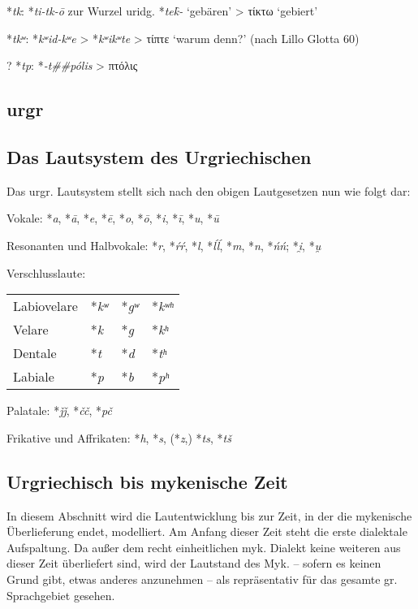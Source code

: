 \documentclass[12pt,a4paper,normalheadings]{scrartcl}
\def\rek#1{*\textit{#1}}
\begin{document}
\rek{tk}: \rek{ti-tk-ō} zur Wurzel uridg. \rek{tek̑-} `gebären' > τίκτω `gebiert'

\rek{tkʷ}: \rek{kʷid-kʷe} > \rek{kʷikʷte} > τίπτε `warum denn?' (nach Lillo Glotta 60)

? \rek{tp}: \rek{-t\#\#pólis} > πτόλις

\subsection*{urgr}

\subsection*{Das Lautsystem des Urgriechischen}
Das urgr. Lautsystem stellt sich nach den obigen Lautgesetzen nun wie folgt dar:

\bigskip
\noindent
Vokale: \rek{a}, \rek{ā}, \rek{e}, \rek{ē}, \rek{o}, \rek{ō},
\rek{i}, \rek{ī}, \rek{u}, \rek{ū}

\noindent
Resonanten und Halbvokale: \rek{r}, \rek{ŕŕ}, \rek{l}, \rek{ĺĺ},
\rek{m}, \rek{n}, \rek{ńń}; \rek{i̯}, \rek{u̯}

\noindent
Verschlusslaute:\\
\begin{tabular}{l l l l}
Labiovelare & \rek{kʷ} & \rek{gʷ} & \rek{kʷʰ}\\
Velare & \rek{k} & \rek{g} & \rek{kʰ}\\
Dentale & \rek{t} & \rek{d} & \rek{tʰ}\\
Labiale & \rek{p} & \rek{b} & \rek{pʰ}\\
\end{tabular}

\noindent
Palatale: \rek{ǰǰ}, \rek{čč}, \rek{pč}

\noindent
Frikative und Affrikaten: \rek{h}, \rek{s}, (\rek{z},) \rek{ts}, \rek{tš}

\subsection{Urgriechisch bis mykenische Zeit}

In diesem Abschnitt wird die Lautentwicklung bis zur Zeit,
in der die mykenische Überlieferung endet, modelliert.
Am Anfang dieser Zeit steht die erste dialektale Aufspaltung.
Da außer dem recht einheitlichen myk. Dialekt keine weiteren aus dieser
Zeit überliefert sind,
wird der Lautstand des Myk.
-- sofern es keinen Grund gibt, etwas anderes anzunehmen --
als repräsentativ für das gesamte gr. Sprachgebiet gesehen.
\end{document}
